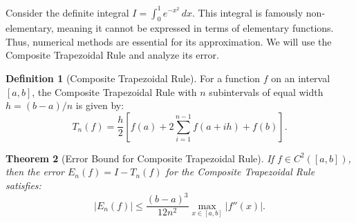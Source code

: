 \documentclass[11pt, a4paper]{article}
\theoremstyle{plain} %
\newtheorem{theorem}{Theorem}[section] %
\theoremstyle{definition} %
\newtheorem{definition}[theorem]{Definition}
\theoremstyle{remark} %
\begin{document}
Consider the definite integral \( I = \int_0^1 e^{-x^2} \, dx \). This integral is famously non-elementary, meaning it cannot be expressed in terms of elementary functions. Thus, numerical methods are essential for its approximation. We will use the Composite Trapezoidal Rule and analyze its error.

\begin{definition}[Composite Trapezoidal Rule]
    \label{def:trapezoidal}
    For a function \( f \) on an interval \( [a,b] \), the Composite Trapezoidal Rule with \( n \) subintervals of equal width \( h = (b-a)/n \) is given by:
    \[ T_n(f) = \frac{h}{2} \left[ f(a) + 2\sum_{i=1}^{n-1} f(a+ih) + f(b) \right]. \]
\end{definition}

\begin{theorem}[Error Bound for Composite Trapezoidal Rule]
    \label{thm:trapezoidal_error}
    If \( f \in C^2([a,b]) \), then the error \( E_n(f) = I - T_n(f) \) for the Composite Trapezoidal Rule satisfies:
    \[ |E_n(f)| \le \frac{(b-a)^3}{12n^2} \max_{x \in [a,b]} |f''(x)|. \]
\end{theorem}
\end{document}
